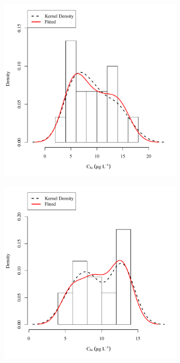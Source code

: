 \subfiguretop
\begin{landscape}
	\begin{figure}
		\begin{subfigure}{0.7\textwidth}
			\centering
			\includegraphics[width=\tableCustomSize]{"Figures/Results_USR/Stochastic/Conc Model ResDist U163"}
		\end{subfigure}%
		\begin{subfigure}{0.7\textwidth}
			\centering
			\includegraphics[width=\tableCustomSize]{"Figures/Results_USR/Stochastic/Conc Model ResDist U201"}

\end{subfigure}
\end{figure}
\end{landscape}
